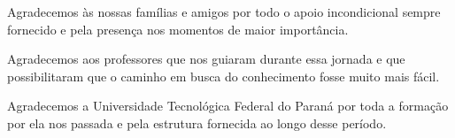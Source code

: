 
\begin{agradecimentos}[AGRADECIMENTOS]

Agradecemos às nossas famílias e amigos por todo o apoio incondicional sempre fornecido e pela presença nos momentos de maior importância.

Agradecemos aos professores que nos guiaram durante essa jornada e que possibilitaram que o caminho em busca do conhecimento fosse muito mais fácil.

Agradecemos a Universidade Tecnológica Federal do Paraná por toda a formação por ela nos passada e pela estrutura fornecida ao longo desse período. 

\end{agradecimentos}
